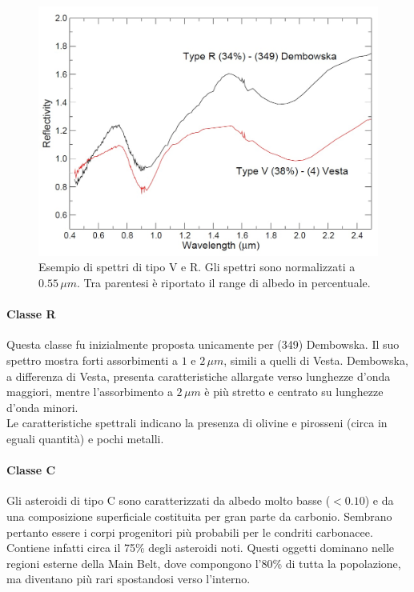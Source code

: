 \documentclass[a4paper,11pt,openright]{book}
\begin{document}
\begin{figure}[!h]
    \centering
    \includegraphics[scale=0.3]{figure/spettro_rv.jpg}
    \caption[Esempio di spettri di tipo V e R.]{Esempio di spettri di tipo V e R. Gli spettri sono normalizzati a $0.55\,\mu m$. Tra parentesi è riportato il range di albedo in percentuale. \citep{magrin_spectroscopic_nodate}}
    \label{spettro_rv}
\end{figure}

\paragraph*{Classe R}
Questa classe fu inizialmente proposta unicamente per (349) Dembowska. Il suo spettro mostra forti assorbimenti a $1$ e $2\,\mu m$, simili a quelli di Vesta. Dembowska, a differenza di Vesta, presenta caratteristiche allargate verso lunghezze d'onda maggiori, mentre l'assorbimento a $2\,\mu m$ è più stretto e centrato su lunghezze d'onda minori.\\
Le caratteristiche spettrali indicano la presenza di olivine e pirosseni (circa in eguali quantità) e pochi metalli. 

\paragraph*{Classe C}
Gli asteroidi di tipo C sono caratterizzati da albedo molto basse ($<0.10$) e da una composizione superficiale costituita per gran parte da carbonio. Sembrano pertanto essere i corpi progenitori più probabili per le condriti carbonacee. Contiene infatti circa il 75\% degli asteroidi noti. Questi oggetti dominano nelle regioni esterne della Main Belt, dove compongono l'80\% di tutta la popolazione, ma diventano più rari spostandosi verso l'interno.\\
\end{document}
